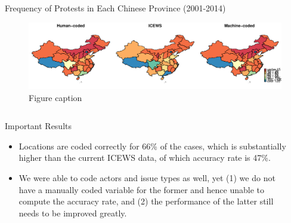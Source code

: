 \documentclass[final]{beamer}
\newlength{\sepwid}
\newlength{\twocolwid}
\newlength{\threecolwid}
\begin{document}
\begin{frame}[t]
\begin{columns}[t]
\begin{column}{\threecolwid}
\begin{columns}[t,totalwidth=\twocolwid]
\begin{column}{\twocolwid}
\begin{block}{Frequency of Protests in Each Chinese Province (2001-2014)}
\begin{figure}
\includegraphics[width=0.8\linewidth]{china_maps.pdf}
\caption{Figure caption}
\end{figure}
\end{block}

\end{column} %
\end{columns} %

\vspace{10mm}

\begin{columns}[t,totalwidth=\threecolwid] %

\begin{column}{\twocolwid}\vspace{-.6in} %

\begin{alertblock}{Important Results}
\begin{itemize}
\item Locations are coded correctly for 66\% of the cases, which is substantially higher than the current ICEWS data, of which accuracy rate is 47\%.
\item We were able to code actors and issue types as well, yet (1) we do not have a manually coded variable for the former and hence unable to compute the accuracy rate, and (2) the performance of the latter still needs to be improved greatly.
\end{itemize}

\end{alertblock} 

\end{column}


\begin{column}{\sepwid}\end{column} %



\end{columns}
\end{column}
\end{columns}
\end{frame}
\end{document}
